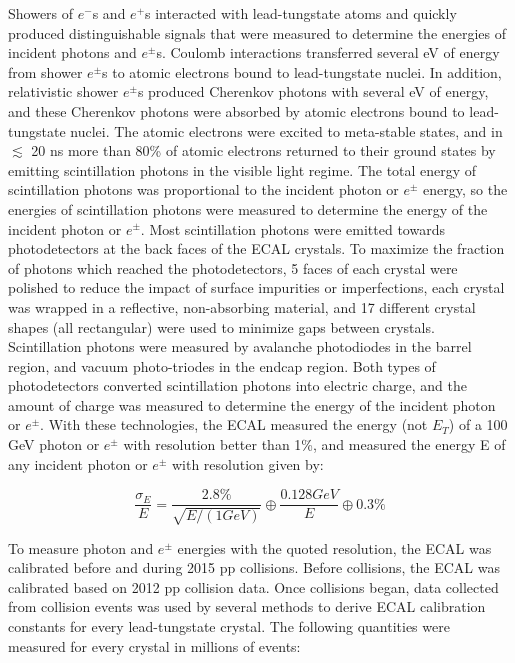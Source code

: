 Showers of $e^{-}$s and $e^{+}$s interacted with lead-tungstate atoms and quickly produced distinguishable 
signals that were measured to determine the energies of incident photons and $e^{\pm}$s.  Coulomb interactions 
transferred several eV of energy from shower $e^{\pm}$s to atomic electrons bound to lead-tungstate nuclei.  
In addition, relativistic shower $e^{\pm}$s produced Cherenkov photons with several eV of energy, and 
these Cherenkov photons were absorbed by atomic electrons bound to lead-tungstate nuclei.  The atomic 
electrons were excited to meta-stable states, and in $\lesssim$ 20 ns more than 80\% of atomic electrons 
returned to their ground states by emitting scintillation photons in the visible light regime.  The total energy of 
scintillation photons was proportional to the incident photon or $e^{\pm}$ energy, so the energies 
of scintillation photons were measured to determine the energy of the incident photon or $e^{\pm}$.  Most 
scintillation photons were emitted towards photodetectors at the back faces of the ECAL crystals.  To 
maximize the fraction of photons which reached the photodetectors, 5 faces of each crystal were polished 
to reduce the impact of surface impurities or imperfections, each crystal was wrapped in a reflective, 
non-absorbing material, and 17 different crystal shapes (all rectangular) were used to minimize gaps 
between crystals.  Scintillation photons were measured by avalanche photodiodes in the barrel region, 
and vacuum photo-triodes in the endcap region.  Both types of photodetectors converted scintillation 
photons into electric charge, and the amount of charge was measured to determine the energy of the 
incident photon or $e^{\pm}$.  With these technologies, the ECAL measured the energy (not $E_{T}$) of 
a 100 GeV photon or $e^{\pm}$ with resolution better than 1\%, and measured the energy E of any 
incident photon or $e^{\pm}$ with resolution given by:

\begin{equation}
	\frac{\sigma_{E}}{E} = \frac{2.8\%}{\sqrt{E/(1 GeV)}} \oplus \frac{0.128 GeV}{E} \oplus 0.3\%
\end{equation}

To measure photon and $e^{\pm}$ energies with the quoted resolution, the ECAL was calibrated before 
and during 2015 pp collisions.  Before collisions, the ECAL was calibrated based on 2012 pp collision 
data.  Once collisions began, data collected from collision events was used by several methods 
to derive ECAL calibration constants for every lead-tungstate crystal.  The following quantities 
were measured for every crystal in millions of events:

